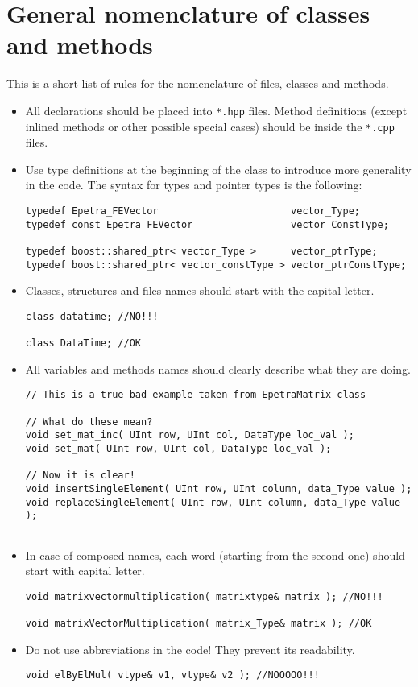 \documentclass[a4paper]{article}
\begin{document}
\section{General nomenclature of classes and methods}
This is a short list of rules for the nomenclature of files, classes and
methods.
\begin{itemize}
  \item All declarations should be placed into \texttt{*.hpp} files. Method
  definitions (except inlined methods or other possible special cases)
  should be inside the \texttt{*.cpp} files.
  \item Use type definitions at the beginning of the class to introduce more
  generality in the code. The syntax for types and pointer types is
  the following:
\begin{lstlisting}
typedef Epetra_FEVector                       vector_Type;
typedef const Epetra_FEVector                 vector_ConstType;

typedef boost::shared_ptr< vector_Type >      vector_ptrType;
typedef boost::shared_ptr< vector_constType > vector_ptrConstType;
\end{lstlisting}
  \item Classes, structures and files names should start with the capital
  letter.
\begin{lstlisting}
class datatime; //NO!!!
  
class DataTime; //OK
\end{lstlisting}
  \item All variables and methods names should clearly describe what they are
  doing.
\begin{lstlisting}
// This is a true bad example taken from EpetraMatrix class
  
// What do these mean?
void set_mat_inc( UInt row, UInt col, DataType loc_val );
void set_mat( UInt row, UInt col, DataType loc_val );
  
// Now it is clear!
void insertSingleElement( UInt row, UInt column, data_Type value );
void replaceSingleElement( UInt row, UInt column, data_Type value );
  
  \end{lstlisting}
  \item In case of composed names, each word (starting from the second one)
  should start with capital letter.
\begin{lstlisting}
void matrixvectormultiplication( matrixtype& matrix ); //NO!!!
  
void matrixVectorMultiplication( matrix_Type& matrix ); //OK
\end{lstlisting}
  \item Do not use abbreviations in the code! They prevent its readability.
\begin{lstlisting}
void elByElMul( vtype& v1, vtype& v2 ); //NOOOOO!!!
  

\end{lstlisting}
\end{itemize}
\end{document}
